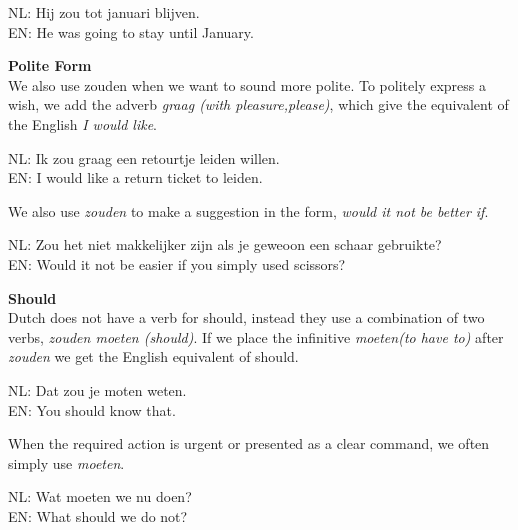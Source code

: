 \documentclass[letterpaper,11pt]{article}
\begin{document}
\begin{small}
    \indent NL: Hij zou tot januari blijven. \\
    \indent EN: He was going to stay until January. \\
\end{small}
\textbf{Polite Form} \\
We also use zouden when we want to sound more polite. To politely express a
wish, we add the adverb \textit{graag (with pleasure,please)}, which give the
equivalent of the English \textit{I would like}.
\\
\begin{small}
    \indent NL: Ik zou graag een retourtje leiden willen. \\
    \indent EN: I would like a return ticket to leiden. \\
\end{small}
We also use \textit{zouden} to make a suggestion in the form, \textit{would
it not be better if}.
\\
\begin{small}
    \indent NL: Zou het niet makkelijker zijn als je geweoon een schaar gebruikte? \\
    \indent EN: Would it not be easier if you simply used scissors? \\
\end{small}
\textbf{Should} \\
Dutch does not have a verb for should, instead they use a combination of two
verbs, \textit{zouden moeten (should)}. If we place the infinitive
\textit{moeten(to have to)} after \textit{zouden} we get the English
equivalent of should.
\\
\begin{small}
    \indent NL: Dat zou je moten weten. \\
    \indent EN: You should know that. \\
\end{small}
When the required action is urgent or presented as a clear command, we often
simply use \textit{moeten}.
\\
\begin{small}
    \indent NL: Wat moeten we nu doen? \\
    \indent EN: What should we do not? \\
\end{small}
\end{document}
